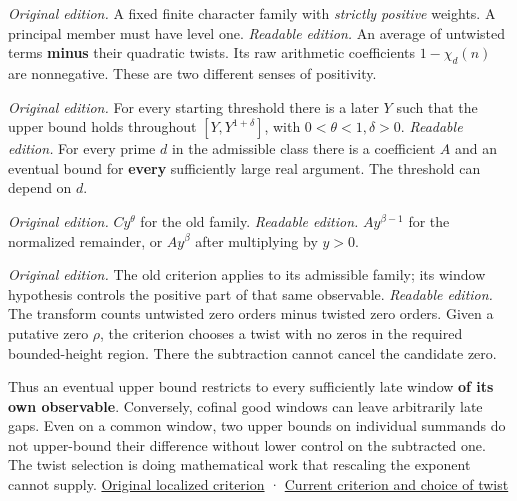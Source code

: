 \documentclass[11pt,letterpaper]{article}
\begin{document}
\par\medskip{} 
\emph{Original edition.} A fixed finite character family with \emph{strictly positive} weights. A principal member must have level one. \emph{Readable edition.} An average of untwisted terms \textbf{minus} their quadratic twists. Its raw arithmetic coefficients $1-\chi _d(n)$ are nonnegative. These are two different senses of positivity.
\par\medskip{} 
\emph{Original edition.} For every starting threshold there is a later $Y$ such that the upper bound holds throughout $[Y,Y^{1+\delta }]$, with $0<\theta <1, \delta >0$. \emph{Readable edition.} For every prime $d$ in the admissible class there is a coefficient $A$ and an eventual bound for \textbf{every} sufficiently large real argument. The threshold can depend on $d$.
\par\medskip{} 
\emph{Original edition.} $C y^\theta $ for the old family. \emph{Readable edition.} $A y^{\beta -1}$ for the normalized remainder, or $A y^\beta $ after multiplying by $y>0$.
\par\medskip{} 
\emph{Original edition.} The old criterion applies to its admissible family; its window hypothesis controls the positive part of that same observable. \emph{Readable edition.} The transform counts untwisted zero orders minus twisted zero orders. Given a putative zero $\rho $, the criterion chooses a twist with no zeros in the required bounded-height region. There the subtraction cannot cancel the candidate zero.

Thus an eventual upper bound restricts to every sufficiently late window \textbf{of its own observable}. Conversely, cofinal good windows can leave arbitrarily late gaps. Even on a common window, two upper bounds on individual summands do not upper-bound their difference without lower control on the subtracted one. The twist selection is doing mathematical work that rescaling the exponent cannot supply. \href{https://github.com/nousentllc/riemann-hypothesis/blob/40e56bab026552e089d7afcfeff08d2defb9c005/src/Development/AutomorphicArithmetic/DedekindLFunctions/LandauTheorems/ZeroFreeOfRpowWindow.lean}{Original localized criterion} · \href{https://github.com/nousentllc/riemann-hypothesis/blob/e063a923620ee7787b4a1270421478645bf66bdb/src/New/Reduction/Zeros/Criterion.lean#L37-L76}{Current criterion and choice of twist}
\end{document}

